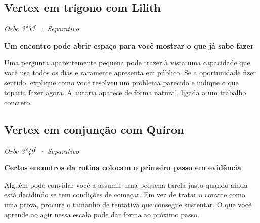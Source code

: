 \documentclass[11pt,a4paper]{article}
\newcommand{\leitura}[3]{\subsection{#1}\textit{#2}\par #3}
\newcommand{\subtituloleitura}[1]{\textbf{#1}\par\nopagebreak[4]}
\begin{document}
\leitura{Vertex em trígono com Lilith}{Orbe 3°33\ensuremath{^{\prime}} · Separativo}{
\subtituloleitura{Um encontro pode abrir espaço para você mostrar o que já sabe fazer}
Uma pergunta aparentemente pequena pode trazer à vista uma capacidade que você usa todos os dias e raramente apresenta em público. Se a oportunidade fizer sentido, explique como você resolveu um problema parecido e indique o que toparia fazer agora. A autoria aparece de forma natural, ligada a um trabalho concreto.
}

\leitura{Vertex em conjunção com Quíron}{Orbe 3°49\ensuremath{^{\prime}} · Separativo}{
\subtituloleitura{Certos encontros da rotina colocam o primeiro passo em evidência}
Alguém pode convidar você a assumir uma pequena tarefa justo quando ainda está decidindo se tem condições de começar. Em vez de tratar o convite como uma prova, procure o tamanho de tentativa que consegue sustentar. O que você aprende ao agir nessa escala pode dar forma ao próximo passo.
}
\end{document}
